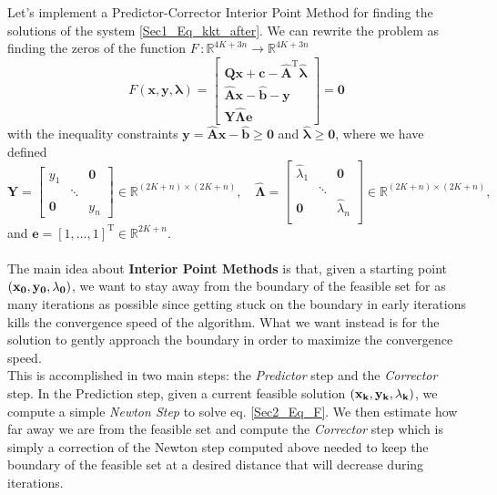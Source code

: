 Let's implement a Predictor-Corrector Interior Point Method for finding the solutions of the system \eqref{Sec1_Eq_kkt_after}. We can rewrite the problem as finding the zeros of the function \(F\,: \mathbb{R}^{4K + 3n} \to \mathbb{R}^{4K + 3n}\)
\begin{equation}
    F(\bm{x}, \bm{y} ,\bm{\lambda}) = \begin{bmatrix}
                        \mathbf{Q}\bm{x} + \bm{c} - \hat{\mathbf{A}}^\mathrm{T}\hat{\bm{\lambda}}\\
                        \hat{\mathbf{A}}\bm{x} - \hat{\bm{b}} - \bm{y}\\
                        \mathbf{Y}\hat{\mathbf{\Lambda}}\bm{e}
                    \end{bmatrix} = \bm{0}
                    \label{Sec2_Eq_F}
    \end{equation}
    with the inequality constraints $\bm{y} = \hat{\mathbf{A}}\bm{x} - \hat{\bm{b}} \geq \bm{0}$ and $\hat{\bm{\lambda}} \geq \bm{0}$, where we have defined
    \[\mathbf{Y} = 	\begin{bmatrix}
            y_1 & & \bm{0}\\
            & \ddots & \\
            \bm{0} && y_n
            \end{bmatrix} \in\mathbb{R}^{(2K+n) \times (2K+n) }, \quad  
            \hat{\mathbf{\Lambda}} = 	
            \begin{bmatrix}
            \hat{\lambda}_1 && \bm{0}\\
            & \ddots & \\
            \bm{0} & & \hat{\lambda}_n \\
            \end{bmatrix} \in\mathbb{R}^{(2K+n)\times (2K+n)},\]
    and $\bm{e} = [1, \dots, 1]^\mathrm{T} \in \mathbb{R}^{2K+n}$. 
\\
\\
\noindent The main idea about \textbf{Interior Point Methods} is that, given a starting point \((\bf{x}_0, \bf{y}_0, \bf{\lambda}_0)\), we want to stay away from the boundary of the feasible set for as many iterations as possible since getting stuck on the boundary in early iterations kills the convergence speed of the algorithm. What we want instead is for the solution to gently approach the boundary in order to maximize the convergence speed. \\
This is accomplished in two main steps: the \textit{Predictor} step and the \textit{Corrector} step. In the Prediction step, given a current feasible solution \((\bf{x}_k, \bf{y}_k, \bf{\lambda}_k)\), we compute a simple \textit{Newton Step} to solve eq. \ref{Sec2_Eq_F}. We then estimate how far away we are from the feasible set and compute the \textit{Corrector} step which is simply a correction of the Newton step computed above needed to keep the boundary of the feasible set at a desired distance that will decrease during iterations.
